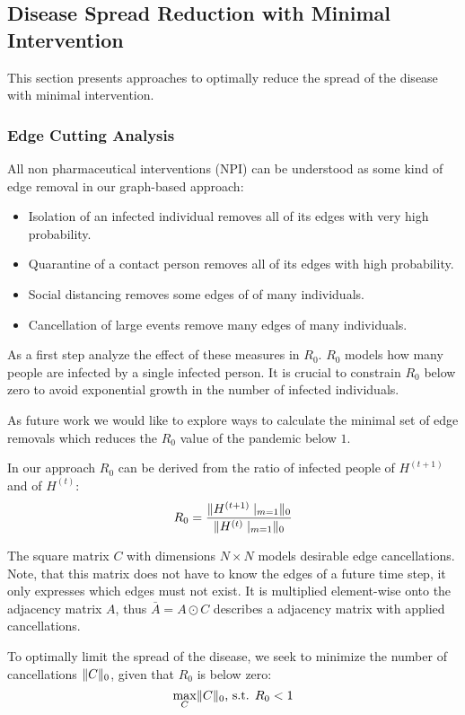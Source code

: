 \documentclass[]{article}
\DeclarePairedDelimiter\norm{\lVert}{\rVert}%
\begin{document}
\subsection{Disease Spread Reduction with Minimal Intervention}
This section presents approaches to optimally reduce the spread of the disease with minimal intervention.

\subsubsection{Edge Cutting Analysis}
All non pharmaceutical interventions (NPI) can be understood as some kind of edge removal in our graph-based approach:
\begin{itemize}
	\item Isolation of an infected individual removes all of its edges with very high probability.
	\item Quarantine of a contact person removes all of its edges with high probability.
	\item Social distancing removes some edges of of many individuals.
	\item Cancellation of large events remove many edges of many individuals.
\end{itemize}
As a first step analyze the effect of these measures in $R_0$.
$R_0$ models how many people are infected by a single infected person.
It is crucial to constrain $R_0$ below zero to avoid exponential growth in the number of infected individuals.


As future work we would like to explore ways to calculate the minimal set of edge removals which reduces the $R_0$ value of the pandemic below $1$.

In our approach $R_0$ can be derived from the ratio of infected people of $H^{(t+1)}$ and of $H^{(t)}$:
\begin{equation}
	R_0 = \frac{\norm{H^{(t+1)}\mid_{m=1}}_{0}}{\norm{H^{(t)}\mid_{m=1}}_{0}} %
\end{equation}

The square matrix $C$ with dimensions $N \times N$ models desirable edge cancellations.
Note, that this matrix does not have to know the edges of a future time step, it only expresses which edges must not exist.
It is multiplied element-wise onto the adjacency matrix $A$, thus $\bar{A} = A \odot C$ describes a adjacency matrix with applied cancellations.

To optimally limit the spread of the disease, we seek to minimize the number of cancellations $\norm{C}_0$, given that $R_0$ is below zero:
\begin{equation}
	\max_{C} \norm{C}_0\text{, s.t. }R_0 < 1
\end{equation}
\end{document}
